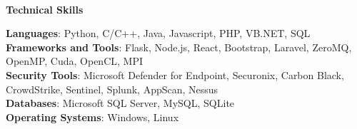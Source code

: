 \begin{flushleft}
    \hrulefill \\
    \begin{large}
        \begin{center}\textbf{Technical Skills}\end{center}
    \end{large} 
\end{flushleft}
\textbf{Languages}: Python, C/C++, Java, Javascript, PHP, VB.NET, SQL \\
\textbf{Frameworks and Tools}: Flask, Node.js, React, Bootstrap, Laravel, ZeroMQ, OpenMP, Cuda, OpenCL, MPI \\
\textbf{Security Tools}: Microsoft Defender for Endpoint, Securonix, Carbon Black, CrowdStrike, Sentinel, Splunk, AppScan, Nessus \\
\textbf{Databases}: Microsoft SQL Server, MySQL, SQLite \\
\textbf{Operating Systems}: Windows, Linux
